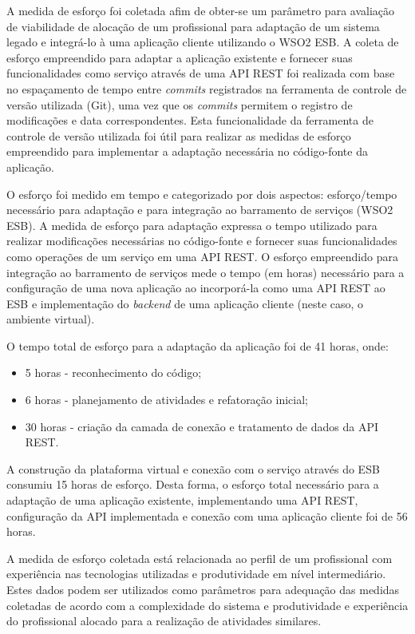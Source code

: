A medida de esforço foi coletada afim de obter-se um parâmetro para avaliação de viabilidade de alocação de um profissional para adaptação de um sistema legado e integrá-lo à uma aplicação cliente utilizando o WSO2 ESB. A coleta de esforço empreendido para adaptar a aplicação existente e fornecer suas funcionalidades como serviço através de uma API REST foi realizada com base no espaçamento de tempo entre \textit{commits} registrados na ferramenta de controle de versão utilizada (Git), uma vez que os \textit{commits} permitem o registro de modificações e data correspondentes. Esta funcionalidade da ferramenta de controle de versão utilizada foi útil para realizar as medidas de esforço empreendido para implementar a adaptação necessária no código-fonte da aplicação.

O esforço foi medido em tempo e categorizado por dois aspectos: esforço/tempo necessário para adaptação e para integração ao barramento de serviços (WSO2 ESB). A medida de esforço para adaptação expressa o tempo utilizado para realizar modificações necessárias no código-fonte e fornecer suas funcionalidades como operações de um serviço em uma API REST. O esforço empreendido para integração ao barramento de serviços mede o tempo (em horas) necessário para a configuração de uma nova aplicação ao incorporá-la como uma API REST ao ESB e implementação do \textit{backend} de uma aplicação cliente (neste caso, o ambiente virtual).

O tempo total de esforço para a adaptação da aplicação foi de 41 horas, onde:
\begin{itemize}
\item 5 horas - reconhecimento do código;
\item 6 horas - planejamento de atividades e refatoração inicial;
\item 30 horas - criação da camada de conexão e tratamento de dados da API REST.
\end{itemize}

A construção da plataforma virtual e conexão com o serviço através do ESB consumiu 15 horas de esforço. Desta forma, o esforço total necessário para a adaptação de uma aplicação existente, implementando uma API REST, configuração da API implementada e conexão com uma aplicação cliente foi de 56 horas.

A medida de esforço coletada está relacionada ao perfil de um profissional com experiência nas tecnologias utilizadas e produtividade em nível intermediário. Estes dados podem ser utilizados como parâmetros para adequação das medidas coletadas de acordo com a complexidade do sistema e produtividade e experiência do profissional alocado para a realização de atividades similares.
